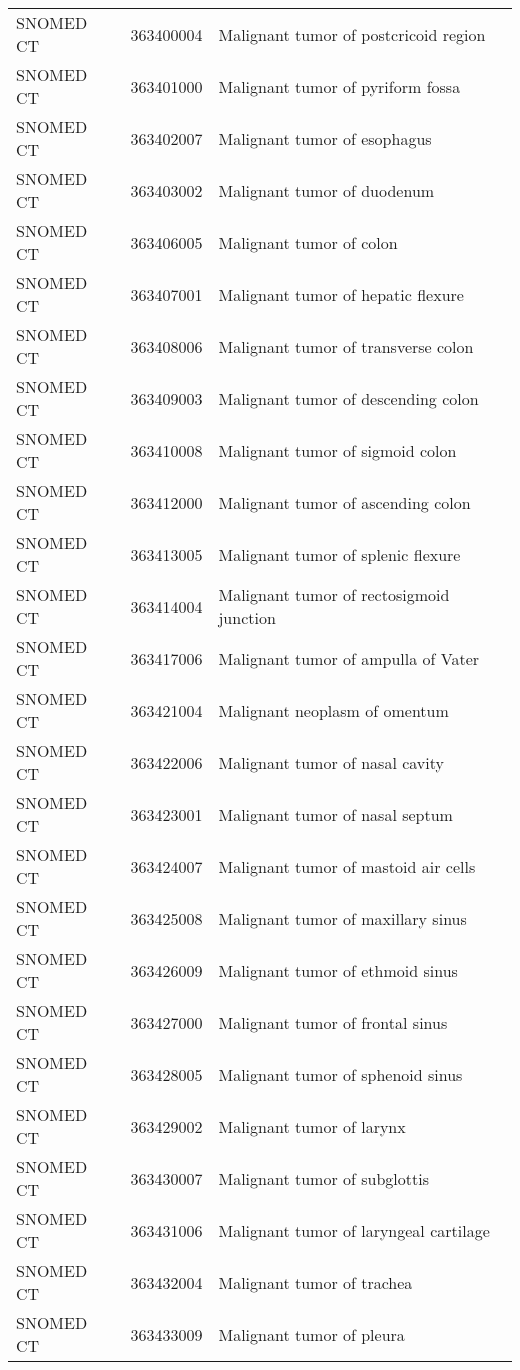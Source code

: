 \begin{longtable}{p{}p{}p{}}
  SNOMED CT & 363400004 & Malignant tumor of postcricoid region \\ 
  SNOMED CT & 363401000 & Malignant tumor of pyriform fossa \\ 
  SNOMED CT & 363402007 & Malignant tumor of esophagus \\ 
  SNOMED CT & 363403002 & Malignant tumor of duodenum \\ 
  SNOMED CT & 363406005 & Malignant tumor of colon \\ 
  SNOMED CT & 363407001 & Malignant tumor of hepatic flexure \\ 
  SNOMED CT & 363408006 & Malignant tumor of transverse colon \\ 
  SNOMED CT & 363409003 & Malignant tumor of descending colon \\ 
  SNOMED CT & 363410008 & Malignant tumor of sigmoid colon \\ 
  SNOMED CT & 363412000 & Malignant tumor of ascending colon \\ 
  SNOMED CT & 363413005 & Malignant tumor of splenic flexure \\ 
  SNOMED CT & 363414004 & Malignant tumor of rectosigmoid junction \\ 
  SNOMED CT & 363417006 & Malignant tumor of ampulla of Vater \\ 
  SNOMED CT & 363421004 & Malignant neoplasm of omentum \\ 
  SNOMED CT & 363422006 & Malignant tumor of nasal cavity \\ 
  SNOMED CT & 363423001 & Malignant tumor of nasal septum \\ 
  SNOMED CT & 363424007 & Malignant tumor of mastoid air cells \\ 
  SNOMED CT & 363425008 & Malignant tumor of maxillary sinus \\ 
  SNOMED CT & 363426009 & Malignant tumor of ethmoid sinus \\ 
  SNOMED CT & 363427000 & Malignant tumor of frontal sinus \\ 
  SNOMED CT & 363428005 & Malignant tumor of sphenoid sinus \\ 
  SNOMED CT & 363429002 & Malignant tumor of larynx \\ 
  SNOMED CT & 363430007 & Malignant tumor of subglottis \\ 
  SNOMED CT & 363431006 & Malignant tumor of laryngeal cartilage \\ 
  SNOMED CT & 363432004 & Malignant tumor of trachea \\ 
  SNOMED CT & 363433009 & Malignant tumor of pleura \\ 

\end{longtable}
